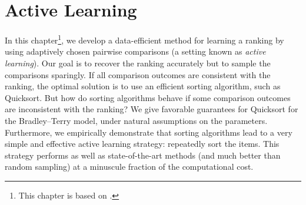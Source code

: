 \chapter{Active Learning}
\label{ch:robustsort}

In this chapter\footnote{%
This chapter is based on \citet{maystre2017just}.},
we develop a data-efficient method for learning a ranking by using adaptively chosen pairwise comparisons (a setting known as \emph{active learning}).
Our goal is to recover the ranking accurately but to sample the comparisons sparingly.
If all comparison outcomes are consistent with the ranking, the optimal solution is to use an efficient sorting algorithm, such as Quicksort.
But how do sorting algorithms behave if some comparison outcomes are inconsistent with the ranking?
We give favorable guarantees for Quicksort for the Bradley--Terry model, under natural assumptions on the parameters.
Furthermore, we empirically demonstrate that sorting algorithms lead to a very simple and effective active learning strategy: repeatedly sort the items.
This strategy performs as well as state-of-the-art methods (and much better than random sampling) at a minuscule fraction of the computational cost.







